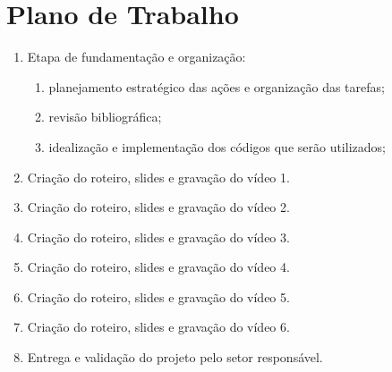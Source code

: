 \documentclass[a4paper,10pt]{article} %
\begin{document}


\section{Plano de Trabalho}

 \begin{enumerate}
  \item Etapa de fundamentação e organização:
      \begin{enumerate}
         \item planejamento estratégico das ações e organização das tarefas;
         \item revisão bibliográfica;
         \item idealização e implementação dos códigos que serão utilizados;
      \end{enumerate}    
  \item Criação do roteiro, slides e gravação do vídeo 1.
  \item Criação do roteiro, slides e gravação do vídeo 2.
  \item Criação do roteiro, slides e gravação do vídeo 3.
  \item Criação do roteiro, slides e gravação do vídeo 4.
  \item Criação do roteiro, slides e gravação do vídeo 5.
  \item Criação do roteiro, slides e gravação do vídeo 6.
  \item Entrega e validação do projeto pelo setor responsável.
\end{enumerate}
\end{document}
